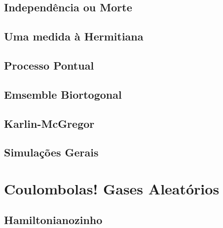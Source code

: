 \documentclass[11pt,oneside,a4paper]{report}
\begin{document}
\section{Independência ou Morte}


\section{Uma medida à Hermitiana}


%

\section{Processo Pontual}


\section{Emsemble Biortogonal}


\section{Karlin-McGregor}


\section{Simulações Gerais}


\chapter{Coulombolas! Gases Aleatórios}


\section{Hamiltonianozinho}


%
\end{document}
